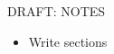 \begin{frame}{DRAFT: NOTES}

  \begin{itemize}
      \item Write sections
  \end{itemize}
  
\end{frame}

